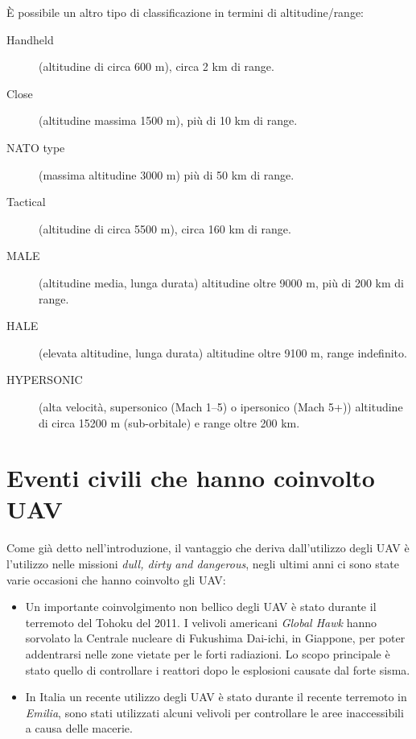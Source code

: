È possibile un altro tipo di classificazione in termini di altitudine/range:

\begin{description}
 \item[Handheld] (altitudine di circa 600 m), circa 2 km di range.
 \item[Close] (altitudine massima 1500 m), più di 10 km di range.
 \item[NATO type] (massima altitudine 3000 m) più di 50 km di range.
 \item[Tactical] (altitudine di circa 5500 m), circa 160 km di range.
 \item[MALE] (altitudine media, lunga durata) altitudine oltre 9000 m, più di 200 km di range. 
 \item[HALE] (elevata altitudine, lunga durata) altitudine oltre 9100 m, range indefinito.
 \item[HYPERSONIC] (alta velocità, supersonico (Mach 1–5) o ipersonico (Mach 5+)) altitudine di circa 15200 m (sub-orbitale) e range oltre 200 km.
\end{description}

\section{Eventi civili che hanno coinvolto UAV}
Come già detto nell'introduzione, il vantaggio che deriva dall'utilizzo degli \ac{UAV} è l'utilizzo nelle missioni 
\emph{dull, dirty and dangerous}, negli ultimi anni ci sono state varie occasioni che hanno coinvolto gli \ac{UAV}:
\begin{itemize}
 \item Un importante coinvolgimento non bellico degli \ac{UAV} è stato durante il terremoto del Tohoku del 2011. I velivoli americani 
 \emph{Global Hawk} hanno sorvolato la Centrale nucleare di Fukushima Dai-ichi, in Giappone, per poter addentrarsi nelle zone vietate per
 le forti radiazioni. Lo scopo principale è stato quello di controllare i reattori dopo le esplosioni causate dal forte sisma.
 \item In Italia un recente utilizzo degli \ac{UAV} è stato durante il recente terremoto in \emph{Emilia}, sono stati utilizzati alcuni 
 velivoli per controllare le aree inaccessibili a causa delle macerie.
\end{itemize}
